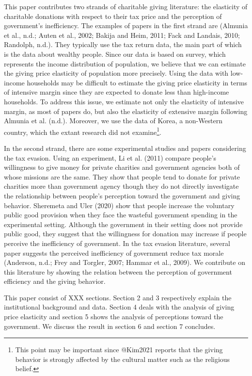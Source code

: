\documentclass[ review  , 3p ]{elsarticle}
\begin{document}
  This paper contributes two strands of charitable giving literature: the elasticity of charitable donations with respect to their tax price and the perception of government's inefficiency. The examples of papers in the first strand are (Almunia et al., n.d.; Auten et al., 2002; Bakija and Heim, 2011; Fack and Landais, 2010; Randolph, n.d.). They typically use the tax return data, the main part of which is the data about wealthy people. Since our data is based on survey, which represents the income distribution of population, we believe that we can estimate the giving price elasticity of population more precisely. Using the data with low-income households may be difficult to estimate the giving price elasticity in terms of intensive margin since they are expected to donate less than high-income households. To address this issue, we estimate not only the elasticity of intensive margin, as most of papers do, but also the elasticity of extensive margin following Almunia et al. (n.d.).
  Moreover, we use the data of Korea, a non-Western country, which the extant research did not examine\footnote{This point may be important since @Kim2021 reports that the giving behavior is strongly affected by the cultural matter such as the religious belief.}.
  
  In the second strand, there are some experimental studies and papers considering the tax evasion. Using an experiment, Li et al. (2011) compare people's willingness to give money for private charities and government agencies both of whose missions are the same. They show that people tend to donate for private charities more than government agency though they do not directly investigate the relationship between people's perception toward the government and giving behavior. Sheremeta and Uler (2020) show that people increase the voluntary public good provision when they face the wasteful government spending in the experimental setting. Although the government in their setting does not provide public good, they suggest that the willingness for donation may increase if people perceive the inefficiency of government. In the tax evasion literature, several paper suggests the perceived inefficiency of government reduce tax morale (Anderson, n.d.; Frey and Torgler, 2007; Hammar et al., 2009). We contribute on this literature by showing the relation between the perception of government efficiency and the giving behavior.
  
  This paper consist of XXX sections. Section 2 and 3 respectively explain the institutional background and data. Section 4 deals with the analysis of giving price elasticity and section 5 shows the analysis of perceptions toward the government. We discuss the result in section 6 and section 7 concludes.
  
\end{document}
